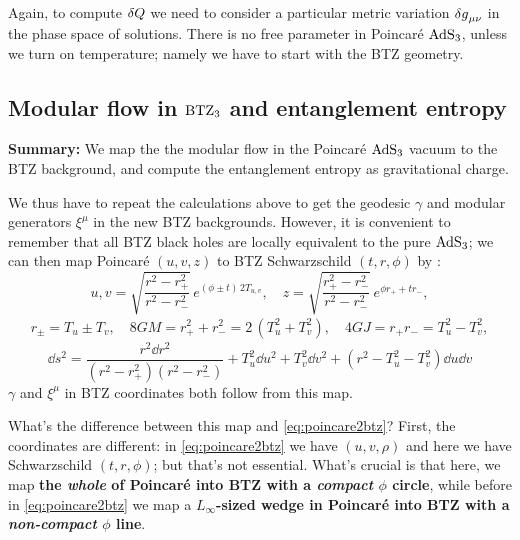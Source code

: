 \documentclass[11pt,a4paper,utf8]{article}
\begin{document}
	Again, to compute $\mathinner{\delta Q}$ we need to consider a particular metric variation $\mathinner{\delta g}_{\mu\nu}$ in the phase space of solutions. There is no free parameter in Poincar\'e $\mathrm{AdS}_3$, unless we turn on temperature; namely we have to start with the BTZ geometry. 
	
\subsection{Modular flow in $\mathrm{BTZ}_3$ and entanglement entropy}
\textbf{Summary:} We map the the modular flow in the Poincar\'e $\mathrm{AdS}_3$ vacuum to the BTZ background, and compute the entanglement entropy as gravitational charge. 

	We thus have to repeat the calculations above to get the geodesic $\gamma$ and modular generators $\xi^\mu$ in the new BTZ backgrounds. However, it is convenient to remember that all BTZ black holes are locally equivalent to the pure $\mathrm{AdS}_3$; we can then map Poincar\'e $(u,v,z)$ to BTZ Schwarzschild $(t,r,\phi)$ by \cite{Hubeny:2007xt}:
	\begin{equation}
		u,v = \sqrt{\frac{r^2 - r_+^2}{r^2 - r_-^2}}\,
			e^{(\phi\pm t)\,2T_{u,v}},
	\quad
		z = \sqrt{\frac{r_+^2 - r_-^2}{r^2 - r_-^2}}\,
			e^{\phi r_+ + t r_-},
	\end{equation}
	\begin{gather}
		r_\pm = T_u \pm T_v,
	\quad
		8GM = r_+^2 + r_-^2
		= 2\,(T_u^2 + T_v^2),
	\quad
		4GJ = r_+ r_-
		= T_u^2 - T_v^2,
	\end{gather}
	\begin{equation}
		\dd{s}^2
		= \frac{r^2 \dd{r}^2}{
				(r^2 - r_+^2)
				(r^2 - r_-^2)
			}
			+ T_u^2 \dd{u}^2
			+ T_v^2 \dd{v}^2
			+ (r^2 - T_u^2 - T_v^2) \dd{u} \dd{v}
	\end{equation}
	$\gamma$ and $\xi^\mu$ in BTZ coordinates both follow from this map. 
	
	What's the difference between this map and \eqref{eq:poincare2btz}? First, the coordinates are different: in \eqref{eq:poincare2btz} we have $(u,v,\rho)$ and here we have Schwarzschild $(t,r,\phi)$; but that's not essential. What's crucial is that here, we map \textbf{the \textsl{whole} of Poincar\'e into BTZ with a \textsl{compact} $\phi$ circle}, while before in \eqref{eq:poincare2btz} we map a \textbf{$L_\infty$-sized wedge in Poincar\'e into BTZ with a \textsl{non-compact} $\phi$ line}. 
	
\end{document}
